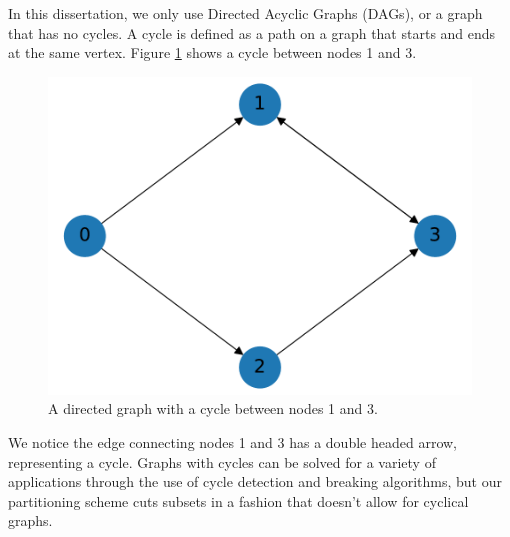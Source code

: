 In this dissertation, we only use Directed Acyclic Graphs (DAGs), or a graph that has no cycles.  A cycle is defined as a path on a graph that starts and ends at the same vertex. Figure \ref{cycle_example} shows a cycle between nodes 1 and 3. 
\begin{figure}[H]
\centering
\includegraphics[scale=0.5]{../../figures/cycle_example.pdf}
\caption{A directed graph with a cycle between nodes 1 and 3.}
\label{cycle_example}
\end{figure}
We notice the edge connecting nodes 1 and 3 has a double headed arrow, representing a cycle. Graphs with cycles can be solved for a variety of applications through the use of cycle detection and breaking algorithms, but our partitioning scheme cuts subsets in a fashion that doesn't allow for cyclical graphs.

